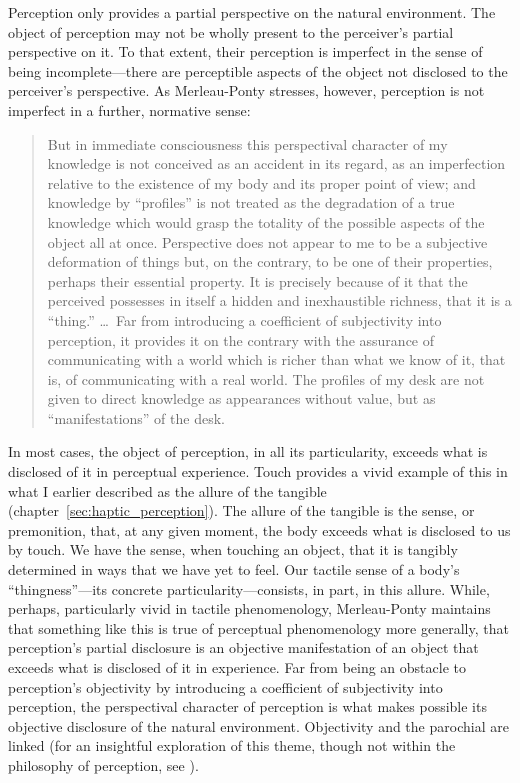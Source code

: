 Perception only provides a partial perspective on the natural environment. The object of perception may not be wholly present to the perceiver's partial perspective on it. To that extent, their perception is imperfect in the sense of being incom\-plete---there are perceptible aspects of the object not disclosed to the perceiver's perspective. As Merleau-Ponty stresses, however, perception is not imperfect in a further, normative sense:
\begin{quote}
	But in immediate consciousness this perspectival character of my knowledge is not conceived as an accident in its regard, as an imperfection relative to the existence of my body and its proper point of view; and knowledge by ``profiles'' is not treated as the degradation of a true knowledge which would grasp the totality of the possible aspects of the object all at once. Perspective does not appear to me to be a subjective deformation of things but, on the contrary, to be one of their properties, perhaps their essential property. It is precisely because of it that the perceived possesses in itself a hidden and inexhaustible richness, that it is a ``thing.'' \ldots\ Far from introducing a coefficient of subjectivity into perception, it provides it on the contrary with the assurance of communicating with a world which is richer than what we know of it, that is, of communicating with a real world. The profiles of my desk are not given to direct knowledge as appearances without value, but as ``manifestations'' of the desk. \citep[186]{Merleau-Ponty:1964ab}
\end{quote}
In most cases, the object of perception, in all its particularity, exceeds what is disclosed of it in perceptual experience. Touch provides a vivid example of this in what I earlier described as the allure of the tangible (chapter~\ref{sec:haptic_perception}). The allure of the tangible is the sense, or premonition, that, at any given moment, the body exceeds what is disclosed to us by touch. We have the sense, when touching an object, that it is tangibly determined in ways that we have yet to feel. Our tactile sense of a body's ``thingness''---its concrete particularity---consists, in part, in this allure. While, perhaps, particularly vivid in tactile phenomenology, Merleau-Ponty maintains that something like this is true of perceptual phenomenology more generally, that perception's partial disclosure is an objective manifestation of an object that exceeds what is disclosed of it in experience. Far from being an obstacle to perception's objectivity by introducing a coefficient of subjectivity into perception, the perspectival character of perception is what makes possible its objective disclosure of the natural environment. Objectivity and the parochial are linked (for an insightful exploration of this theme, though not within the philosophy of perception, see \citealt{Travis:2011qd}).

